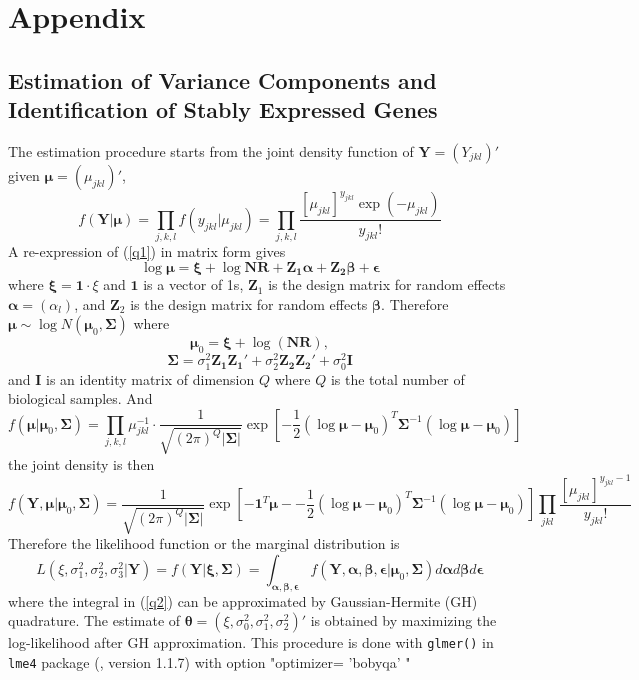 \documentclass[11pt, a4paper]{article}
\begin{document}
\section{Appendix}


\subsection*{ Estimation of Variance Components and Identification of Stably Expressed Genes}



The estimation procedure starts from the joint density function of $\bm Y=(Y_{jkl})'$ given $\bm \mu= (\mu_{jkl})'$, 
\[f(\bm Y|\bm \mu )=\prod_{ j, k,l}f(y_{jkl}|\mu_{jkl})=\prod_{j,k,l}\frac{[\mu_{jkl}]^{y_{jkl}}\exp(-\mu_{jkl})}{y_{jkl}!}\]
A re-expression of  (\ref{q1}) in matrix form gives 
\[\log\bm \mu= \bm \xi + \log{\bm{NR}} + \bm {Z_1\alpha} + \bm{Z_2\beta} + \bm \epsilon \]
where $\bm \xi = \bm 1\cdot\xi$ and $\bm 1$ is a vector of 1s, $\bm Z_1$ is the design matrix for random effects $\bm \alpha=(\alpha_l)$, and $\bm Z_2$ is the design matrix for random effects $\bm \beta $. 
Therefore  $\bm\mu  \sim \log N(\bm \mu_0, \bm \Sigma)$ where 
$$\bm \mu_0 =\bm\xi + \log(\bm {NR}),$$ 
$$\bm \Sigma = \sigma_1^2\bm {Z_1Z_1'} + \sigma_2^2\bm {Z_2 Z_2'} +\sigma_0^2 \bm I$$
and $\bm I$ is an identity matrix of dimension $Q$ where $Q$ is the total number of biological samples. 
And 
\[f(\bm \mu |\bm \mu_0, \bm \Sigma)=\prod_{j,k,l} \mu_{jkl}^{-1}\cdot \frac{1}{ \sqrt{(2\pi)^Q|\bm\Sigma|}}\exp[-\frac{1}{2} {(\log\bm \mu - \bm \mu_0)^T\bm \Sigma^{-1}(\log\bm \mu - \bm \mu_0)}]\]
the joint density is then
\[f(\bm Y, \bm \mu |\bm \mu_0, \bm \Sigma) =\frac{1}{\sqrt{(2\pi)^Q|\bm \Sigma|}}\exp[-\bm 1^T\bm \mu - -\frac{1}{2} {(\log\bm \mu - \bm \mu_0)^T\bm \Sigma^{-1}(\log\bm \mu - \bm \mu_0)}]\prod_{jkl}\frac{[\mu_{jkl}]^{y_{jkl}-1}}{y_{jkl}!}\]
Therefore the likelihood function or the marginal distribution is 
\begin{equation}\label{q2}
L(\xi, \sigma_1^2, \sigma_2^2, \sigma_3^2|\bm Y)=f(\bm Y|\bm \xi, \bm \Sigma)= \int_{\bm{\alpha,\beta,\epsilon}} f(\bm Y, \bm \alpha, \bm \beta, \bm \epsilon |\bm \mu_0, \bm \Sigma)d\bm \alpha d \bm\beta d\bm \epsilon 
\end{equation}
where the integral in (\ref{q2}) can be approximated by Gaussian-Hermite (GH) quadrature. The estimate of $\bm\theta = (\xi, \sigma_0^2, \sigma_1^2, \sigma_2^2)'$ is obtained by maximizing the log-likelihood after GH approximation.  This procedure is done with \verb"glmer()"  in \verb"lme4"  package (\cite{bates2012lme4}, version 1.1.7)  with option  "optimizer= 'bobyqa' " 
\end{document}
